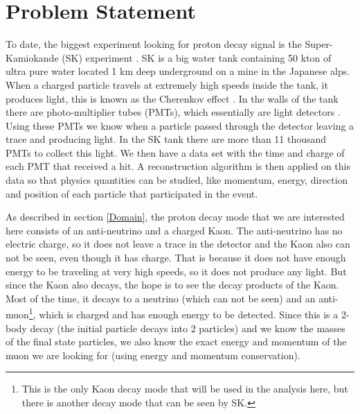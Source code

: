  
 \section{Problem Statement} \label{Problem}

To date, the biggest experiment looking for proton decay signal is the Super-Kamiokande (SK) experiment \cite{SK}. SK is a big water tank containing 50 kton of ultra pure water located 1 km deep underground on a mine in the Japanese alps. When a charged particle travels at extremely high speeds inside the tank, it produces light, this is known as the Cherenkov effect \cite{Cherenkov}. In the walls of the tank there are photo-multiplier tubes (PMTs), which essentially are light detectors \cite{PMT}. Using these PMTs we know when a particle passed through the detector leaving a trace and producing light. In the SK tank there are more than 11 thousand PMTs to collect this light. We then have a data set with the time and charge of each PMT that received a hit. A reconstruction algorithm is then applied on this data so that physics quantities can be studied, like momentum, energy, direction and position of each particle that participated in the event.

As described in section \ref{Domain}, the proton decay mode that we are interested here consists of an anti-neutrino and a charged Kaon. The anti-neutrino has no electric charge, so it does not leave a trace in the detector and the Kaon also can not be seen, even though it has charge. That is because it does not have enough energy to be traveling at very high speeds, so it does not produce any light. But since the Kaon also decays, the hope is to see the decay products of the Kaon. Most of the time, it decays to a neutrino (which can not be seen) and an anti-muon\footnote{This is the only Kaon decay mode that will be used in the analysis here, but there is another decay mode that can be seen by SK.}, which is charged and has enough energy to be detected. Since this is a 2-body decay (the initial particle decays into 2 particles) and we know the masses of the final state particles, we also know the exact energy and momentum of the muon we are looking for (using energy and momentum conservation).

